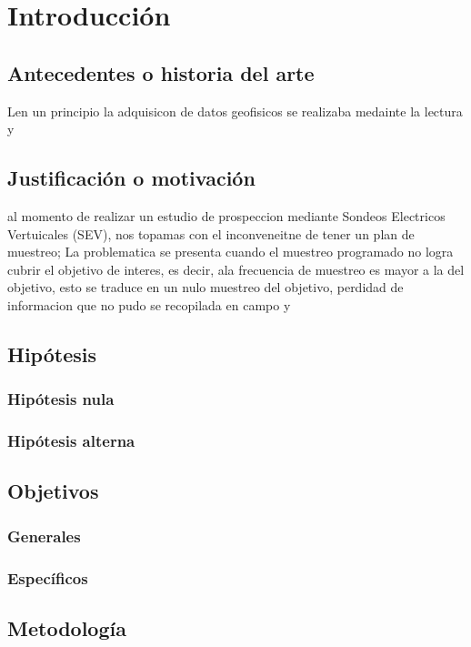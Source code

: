 \chapter{Introducción}

\section{Antecedentes o historia del arte}

Len un principio la adquisicon de datos geofisicos se realizaba medainte la lectura y 

\section{Justificación o motivación}

al momento de realizar un estudio de prospeccion mediante Sondeos Electricos Vertuicales (SEV), nos topamas con el inconveneitne de tener un plan de muestreo;
La problematica se presenta cuando el muestreo programado no logra cubrir el objetivo de interes, es decir, ala frecuencia de muestreo es mayor a la del objetivo, esto se traduce en un nulo muestreo del objetivo, perdidad de informacion que no pudo se recopilada en campo y 
\section{Hipótesis}
\subsection{Hipótesis nula}
\subsection{Hipótesis alterna}

\section{Objetivos}

\subsection{Generales}

\subsection{Específicos}

\section{Metodología}



